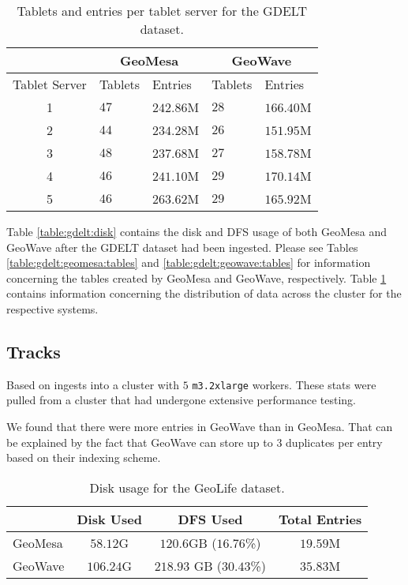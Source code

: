 \begin{table}[h!tb]
  \centering
  \begin{tabular}{ | c| | l | l || l | l |}
    \hline
    & \multicolumn{2}{c||}{GeoMesa} & \multicolumn{2}{c|}{GeoWave} \\ \hline
    Tablet Server & Tablets & Entries & Tablets & Entries \\ \hline
    1 & $47$ & $242.86$M & $28$ & $166.40$M \\
    2 & $44$ & $234.28$M & $26$ & $151.95$M \\
    3 & $48$ & $237.68$M & $27$ & $158.78$M \\
    4 & $46$ & $241.10$M & $29$ & $170.14$M \\
    5 & $46$ & $263.62$M & $29$ & $165.92$M \\
    \hline
  \end{tabular}
  \caption{Tablets and entries per tablet server for the GDELT dataset.}
  \label{table:gdelt:tablets}
\end{table}

Table \ref{table:gdelt:disk} contains the disk and DFS usage of both GeoMesa and GeoWave after the GDELT dataset had been ingested.
Please see Tables \ref{table:gdelt:geomesa:tables} and \ref{table:gdelt:geowave:tables} for information concerning the tables created by GeoMesa and GeoWave, respectively.
Table \ref{table:gdelt:tablets} contains information concerning the distribution of data across the cluster for the respective systems.


\subsection{Tracks}

Based on ingests into a cluster with $5$ \texttt{m3.2xlarge} workers.
These stats were pulled from a cluster that had undergone extensive performance testing.

We found that there were more entries in GeoWave than in GeoMesa.
That can be explained by the fact that GeoWave can store up to 3 duplicates per entry based on their indexing scheme.

\begin{table}[h!tb]
  \centering
  \begin{tabular}{ | l || c | c | c | }
    \hline
    & Disk Used & DFS Used & Total Entries \\
    \hline
    GeoMesa & $58.12$G & $120.6$GB ($16.76$\%) & $19.59$M \\
    GeoWave & $106.24$G & $218.93$ GB ($30.43$\%) & $35.83$M \\
    \hline
  \end{tabular}
  \caption{Disk usage for the GeoLife dataset.}
  \label{table:tracks:disk}
\end{table}

